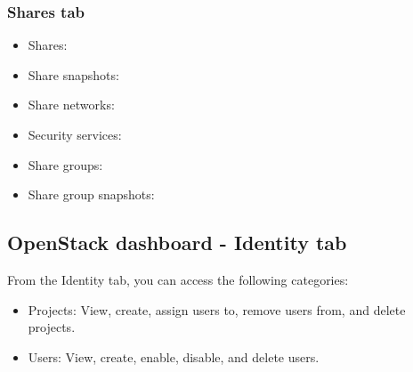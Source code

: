 \subsubsection{\texorpdfstring{Shares
tab}{Shares tab}}\label{shares-tab}

\begin{itemize}
\item
  Shares:
\item
  Share snapshots:
\item
  Share networks:
\item
  Security services:
\item
  Share groups:
\item
  Share group snapshots:
\end{itemize}

\subsection{OpenStack dashboard - Identity
tab}\label{openstack-dashboard---identity-tab}

From the Identity tab, you can access the following categories:

\begin{itemize}
\item
  Projects: View, create, assign users to, remove users from, and delete
  projects.
\item
  Users: View, create, enable, disable, and delete users.
\end{itemize}
